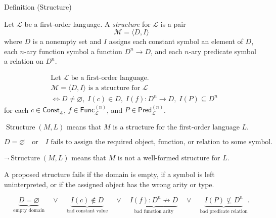 \begin{definitionbox}{Definition (Structure)}
\begin{definition}[Structure]
\label{def:structure}
Let \(\mathcal L\) be a first-order language. A \emph{structure} for
\(\mathcal L\) is a pair
\[
\mathcal M=\langle D,I\rangle
\]
where \(D\) is a nonempty set and \(I\) assigns each constant symbol an element
of \(D\), each \(n\)-ary function symbol a function \(D^n\to D\), and each
\(n\)-ary predicate symbol a relation on \(D^n\).
\end{definition}
\end{definitionbox}

\begin{remark*}
\[
\begin{aligned}
&\text{Let } \mathcal L \text{ be a first-order language.}\\
&\mathcal M=\langle D,I\rangle \text{ is a structure for } \mathcal L\\
&\Longleftrightarrow
D\neq\varnothing,\;
I(c)\in D,\;
I(f):D^n\to D,\;
I(P)\subseteq D^n
\end{aligned}
\]
for each \(c\in\mathsf{Const}_{\mathcal L}\),
\(f\in\mathsf{Func}_{\mathcal L}^{(n)}\), and
\(P\in\mathsf{Pred}_{\mathcal L}^{(n)}\).
\end{remark*}

\begin{remark*}
\(\operatorname{Structure}(M,L)\) means that \(M\) is a structure for the
first-order language \(L\).
\end{remark*}

\begin{remark*}
\[
D=\varnothing
\quad\text{or}\quad
I \text{ fails to assign the required object, function, or relation to some symbol.}
\]
\end{remark*}

\begin{remark*}
\(\neg\operatorname{Structure}(M,L)\) means that \(M\) is not a well-formed
structure for \(L\).
\end{remark*}

\begin{remark*}
A proposed structure fails if the domain is empty, if a symbol is left
uninterpreted, or if the assigned object has the wrong arity or type.
\end{remark*}

\begin{remark*}
\[
\underbrace{D=\varnothing}_{\text{empty domain}}
\quad\lor\quad
\underbrace{I(c)\notin D}_{\text{bad constant value}}
\quad\lor\quad
\underbrace{I(f):D^n\not\to D}_{\text{bad function arity}}
\quad\lor\quad
\underbrace{I(P)\not\subseteq D^n}_{\text{bad predicate relation}}.
\]
\end{remark*}

